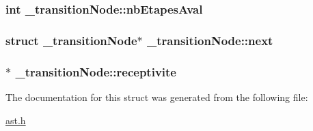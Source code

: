 \subsubsection[{\texorpdfstring{nb\+Etapes\+Aval}{nbEtapesAval}}]{\setlength{\rightskip}{0pt plus 5cm}int \+\_\+transition\+Node\+::nb\+Etapes\+Aval}\hypertarget{struct__transitionNode_aef1dc25f41e418fa2bfae7677f8eadea}{}\label{struct__transitionNode_aef1dc25f41e418fa2bfae7677f8eadea}
\subsubsection[{\texorpdfstring{next}{next}}]{\setlength{\rightskip}{0pt plus 5cm}struct {\bf \+\_\+transition\+Node}$\ast$ \+\_\+transition\+Node\+::next}\hypertarget{struct__transitionNode_a90e986b6201a33085afd4e19683852cd}{}\label{struct__transitionNode_a90e986b6201a33085afd4e19683852cd}
\subsubsection[{\texorpdfstring{receptivite}{receptivite}}]{$\ast$ \+\_\+transition\+Node\+::receptivite}\hypertarget{struct__transitionNode_a3b078e11bcb7db715b28984fe3483af8}{}\label{struct__transitionNode_a3b078e11bcb7db715b28984fe3483af8}


The documentation for this struct was generated from the following file\+:\begin{DoxyCompactItemize}
\item 
\hyperlink{ast_8h}{ast.\+h}\end{DoxyCompactItemize}
